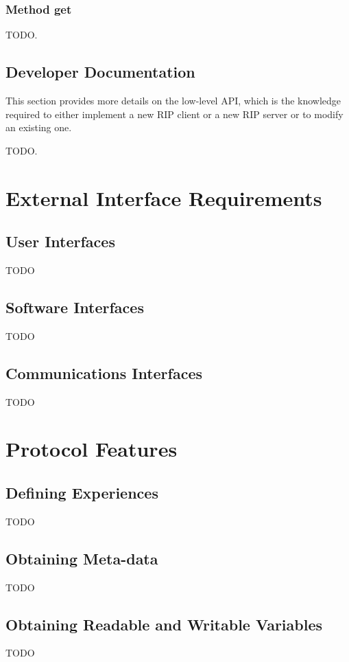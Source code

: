 \subsection{Method get}
TODO.

\section{Developer Documentation}
This section provides more details on the low-level API, which is the knowledge required to either implement a new RIP client or a new RIP server or to modify an existing one.

TODO.


\chapter{External Interface Requirements}
\label{External Interface Requirements}

\section{User Interfaces}
TODO

\section{Software Interfaces}
TODO

\section{Communications Interfaces}
TODO


\chapter{Protocol Features}
\label{System Features}

\section{Defining Experiences}
TODO

\section{Obtaining Meta-data}
TODO

\section{Obtaining Readable and Writable Variables}
TODO

